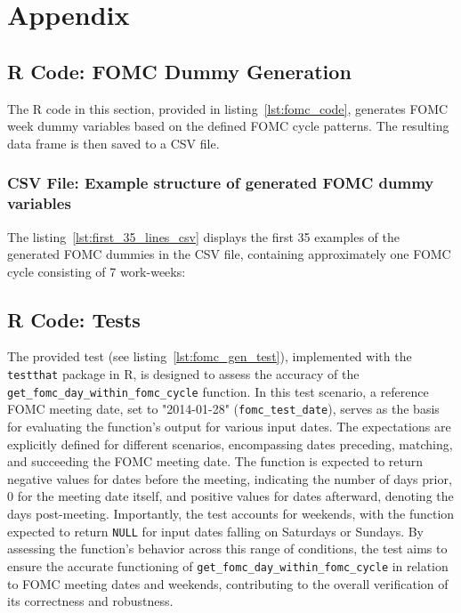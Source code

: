 \chapter{Appendix}

\section{R Code: FOMC Dummy Generation}
\label{app:fomc_code}

The R code in this section, provided in listing~\ref{lst:fomc_code}, generates FOMC week dummy variables based on the defined FOMC cycle patterns. The resulting data frame is then saved to a CSV file.



\subsection{CSV File: Example structure of generated FOMC dummy variables}
\label{app:first_35_lines_csv}

The listing~\ref{lst:first_35_lines_csv} displays the first 35 examples of the generated FOMC dummies in the CSV file,  containing approximately one FOMC cycle consisting of 7 work-weeks:



\section{R Code: Tests}
\label{app:fomc_code}

The provided test (see listing~\ref{lst:fomc_gen_test}), implemented with the \texttt{testthat} package in R, is designed to assess the accuracy of the \texttt{get\_fomc\_day\_within\_fomc\_cycle} function. In this test scenario, a reference FOMC meeting date, set to "2014-01-28" (\texttt{fomc\_test\_date}), serves as the basis for evaluating the function's output for various input dates. The expectations are explicitly defined for different scenarios, encompassing dates preceding, matching, and succeeding the FOMC meeting date. The function is expected to return negative values for dates before the meeting, indicating the number of days prior, 0 for the meeting date itself, and positive values for dates afterward, denoting the days post-meeting. Importantly, the test accounts for weekends, with the function expected to return \texttt{NULL} for input dates falling on Saturdays or Sundays. By assessing the function's behavior across this range of conditions, the test aims to ensure the accurate functioning of \texttt{get\_fomc\_day\_within\_fomc\_cycle} in relation to FOMC meeting dates and weekends, contributing to the overall verification of its correctness and robustness.


